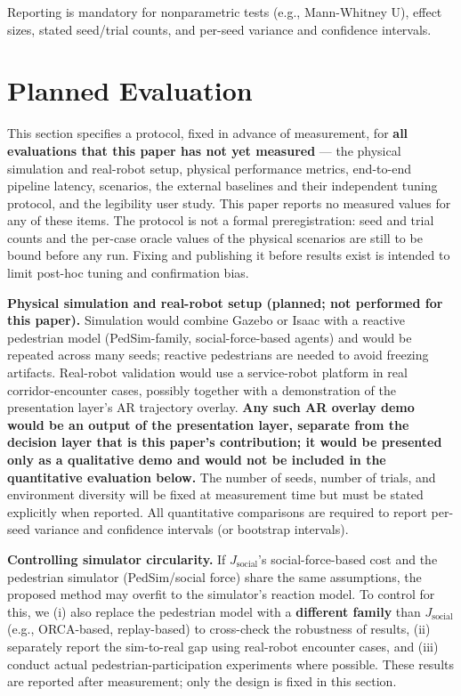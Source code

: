 Reporting is mandatory for nonparametric tests (e.g., Mann-Whitney U), effect sizes, stated seed/trial counts, and per-seed variance and confidence intervals.

\section{Planned Evaluation}\label{app:planned}

This section specifies a protocol, fixed in advance of measurement, for \textbf{all evaluations that this paper has not yet measured} --- the physical simulation and real-robot setup, physical performance metrics, end-to-end pipeline latency, scenarios, the external baselines and their independent tuning protocol, and the legibility user study. This paper reports no measured values for any of these items. The protocol is not a formal preregistration: seed and trial counts and the per-case oracle values of the physical scenarios are still to be bound before any run. Fixing and publishing it before results exist is intended to limit post-hoc tuning and confirmation bias.

\noindent\textbf{Physical simulation and real-robot setup (planned; not performed for this paper).} Simulation would combine Gazebo or Isaac with a reactive pedestrian model (PedSim-family, social-force-based agents) and would be repeated across many seeds; reactive pedestrians are needed to avoid freezing artifacts. Real-robot validation would use a service-robot platform in real corridor-encounter cases, possibly together with a demonstration of the presentation layer's AR trajectory overlay. \textbf{Any such AR overlay demo would be an output of the presentation layer, separate from the decision layer that is this paper's contribution; it would be presented only as a qualitative demo and would not be included in the quantitative evaluation below.} The number of seeds, number of trials, and environment diversity will be fixed at measurement time but must be stated explicitly when reported. All quantitative comparisons are required to report per-seed variance and confidence intervals (or bootstrap intervals).

\noindent\textbf{Controlling simulator circularity.} If $J_{\text{social}}$'s social-force-based cost and the pedestrian simulator (PedSim/social force) share the same assumptions, the proposed method may overfit to the simulator's reaction model. To control for this, we (i) also replace the pedestrian model with a \textbf{different family} than $J_{\text{social}}$ (e.g., ORCA-based, replay-based) to cross-check the robustness of results, (ii) separately report the sim-to-real gap using real-robot encounter cases, and (iii) conduct actual pedestrian-participation experiments where possible. These results are reported after measurement; only the design is fixed in this section.


